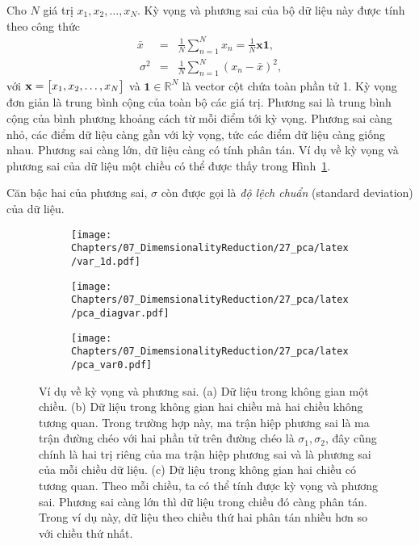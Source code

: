 Cho $N$ giá trị $x_1, x_2, \dots, x_N$. {Kỳ vọng} và {phương sai}
của bộ dữ liệu này được tính theo công thức
\begin{eqnarray}
\bar{x} &=& \frac{1}{N}\sum_{n=1}^N x_n = \frac{1}{N}\mathbf{x1},\\\
\sigma^2 &=& \frac{1}{N} \sum_{n=1}^N (x_n - \bar{x})^2,
\end{eqnarray}
với $\mathbf{x} = \left[\begin{matrix} x_1, x_2, \dots, x_N\end{matrix}\right] $ và $\mathbf{1} \in \mathbb{R}^N$ là
vector cột chứa toàn phần tử 1. Kỳ vọng đơn giản là trung bình cộng của toàn bộ
các giá trị. Phương sai là trung bình cộng của bình phương khoảng cách từ mỗi
điểm tới kỳ vọng. Phương sai càng nhỏ, các điểm dữ liệu càng gần với kỳ vọng,
tức các điểm dữ liệu càng giống nhau. Phương sai càng lớn, dữ liệu càng có tính
phân tán. Ví dụ về kỳ vọng và phương sai của dữ liệu một chiều có thể được thấy
trong Hình~\ref{fig:27_2a}.

Căn bậc hai của phương sai, $\sigma$ còn được gọi là \textit{độ lệch chuẩn} (standard deviation) của
dữ liệu.


\begin{figure}[t]
\begin{subfigure}{0.325\textwidth}
\texttt{[image: Chapters/07\_DimemsionalityReduction/27\_pca/latex/var\_1d.pdf]}
\caption{}
\label{fig:27_2a}
\end{subfigure}
\begin{subfigure}{0.325\textwidth}
\texttt{[image: Chapters/07\_DimemsionalityReduction/27\_pca/latex/pca\_diagvar.pdf]}
\caption{}
\label{fig:27_2b}
\end{subfigure}
\begin{subfigure}{0.325\textwidth}
\texttt{[image: Chapters/07\_DimemsionalityReduction/27\_pca/latex/pca\_var0.pdf]}
\caption{}
\label{fig:27_2c}
\end{subfigure}
\caption{
Ví dụ về kỳ vọng và phương sai. (a) Dữ liệu trong không gian
một chiều. (b) Dữ liệu trong không gian hai chiều mà hai chiều
không tương quan. Trong trường hợp này, ma trận hiệp phương sai là ma trận
đường chéo với hai phần tử trên đường chéo  là $\sigma_1, \sigma_2$, đây
cũng chính là hai trị riêng của ma trận hiệp phương sai và là phương sai
của mỗi chiều dữ liệu. (c) Dữ liệu trong không gian hai chiều có tương
quan. Theo mỗi chiều, ta có thể tính được kỳ vọng và phương sai. Phương sai
càng lớn thì dữ liệu trong chiều đó càng phân tán. Trong ví dụ này, dữ liệu
theo chiều thứ hai phân tán nhiều hơn so với chiều thứ nhất. }
\label{fig:27_2}
\end{figure}

